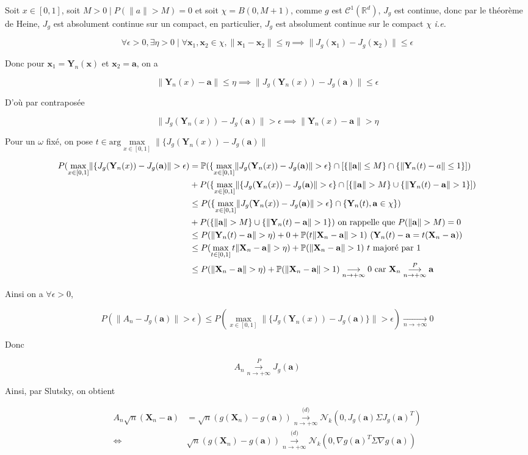 \documentclass[12pt]{article}
\newcommand{\petitespace}{\vspace{0.5cm}}
\newcommand{\bb}[1]{\mathbb{#1}} %
\newcommand{\R}{\bb{R}} %
\renewcommand{\bf}[1]{\mathbf{#1}}
\renewcommand{\P}{\bb{P}}%
\newcommand{\ie}{\textit{i.e.}}
\renewcommand{\cal}{\mathcal}
\newcommand{\Max}[1]{\max\limits_{#1}}
\renewcommand{\bf}[1]{\mathbf{#1}}
\newcommand{\norme}[1]{\lVert #1 \rVert}
\newcommand{\1}{\bb{1}} %
\newcommand{\cvn}{\underset{n\rightarrow+\infty}{\longrightarrow}} %
\newcommand{\cvP}{\overset{P}{\cvn}} %
\newcommand{\cvl}{\overset{\mathcal (d)}{\cvn}} %
\begin{document}
{Soit $x \in [0,1]$, soit $M>0 \mid P(\norme{a}>M)=0$ et soit $\chi = B(0,M+1)$, comme $g$ est $\cal C^1(\R^d)$, $J_g$ est continue, donc par le théorème de Heine, $J_g$ est absolument continue sur un compact, en particulier, $J_g$ est absolument continue sur le compact $\chi$ \ie

$$\forall \epsilon >0, \exists \eta >0 \mid \forall \bf x_1, \bf x_2 \in \chi, \norme{\bf x_1-\bf x_2}\le \eta \implies \norme{J_g(\bf x_1)-J_g(\bf x_2)}\le \epsilon$$

Donc pour $\bf x_1 = \bf Y_n(\bf x)$ et $\bf x_2 = \bf a$, on a 

$$\norme{\bf Y_n(x)-\bf a}\le \eta \implies \norme{J_g(\bf Y_n(x))-J_g(\bf a)}\le \epsilon$$ 

D'où par contraposée

$$\norme{J_g(\bf Y_n(x))-J_g(\bf a)}>\epsilon \implies \norme{\bf Y_n(x)-\bf a}> \eta $$

Pour un $\omega$ fixé, on pose $t \in \text{arg}\Max{x \in [0,1]}\norme{\{J_g(\bf Y_n(x))-J_g(\bf a)}$

\begin{align*}
	 P(\Max{x \in [0,1]}\norme{\{J_g(\bf Y_n(x))-J_g(\bf a)}>\epsilon)&=\P(\{\Max{x \in [0,1]}\norme{J_g(\bf Y_n(x))-J_g(\bf a)}>\epsilon\}\cap[\{\norme{\bf a}\le M\} \cap\{\norme{\bf Y_n(t)-a}\le1\}])\\
	 &+P(\{\Max{x \in [0,1]}\norme{\{J_g(\bf Y_n(x))-J_g(\bf a)}>\epsilon\}\cap[\{\norme{\bf a}> M\} \cup\{\norme{\bf Y_n(t)-\bf a}>1\}])\\
	 &\le P(\{\Max{x \in [0,1]}\norme{J_g(\bf Y_n(x))-J_g(\bf a)}>\epsilon\}\cap \{\bf Y_n(t),\bf a \in \chi\})\\ 
	 &+P(\{\norme{\bf a}> M\} \cup\{\norme{\bf Y_n(t)-\bf a}>1\})\text{ on rappelle que $ P(\norme{\bf a}>M)=0$} \\
	 &\le P(\norme{\bf Y_n(t)-\bf a}> \eta) + 0+\P(t\norme{\bf X_n-\bf a}>1)\text{ ($\bf Y_n(t)-\bf a = t(\bf X_n-\bf a)$)}\\ 
	 &\le P(\Max{t \in [0,1]}t\norme{\bf X_n-\bf a}> \eta)+\P(\norme{\bf X_n-\bf a}>1)\text{ $t$ majoré par 1}\\
	 &\le P(\norme{\bf X_n-\bf a}> \eta) + \P(\norme{\bf X_n-\bf a}>1) \cvn 0 \text{ car $\bf X_n \cvP \bf a$}
\end{align*}	

Ainsi on a $\forall \epsilon >0$,

$$ P(\norme{A_n-J_g(\bf a)}>\epsilon)\le P(\Max{x \in [0,1]}\norme{\{J_g(\bf Y_n(x))-J_g(\bf a)\}}>\epsilon) \cvn 0$$

Donc

 $$A_n \cvP J_g(\bf a)$$

Ainsi, par Slutsky, on obtient

\begin{align*}
A_n \sqrt n(\bf X_n-\bf a)& =\sqrt n(g(\bf X_n)-g(\bf a))\cvl \cal N_k(0, J_g(\bf a)\Sigma J_g(\bf a)^T)\\
\iff &\sqrt n(g( \bf X_n)-g(\bf a))\cvl \cal N_k(0, \nabla g(\bf a)^T\Sigma\nabla g(\bf a))
\end{align*}
\petitespace}
\end{document}
